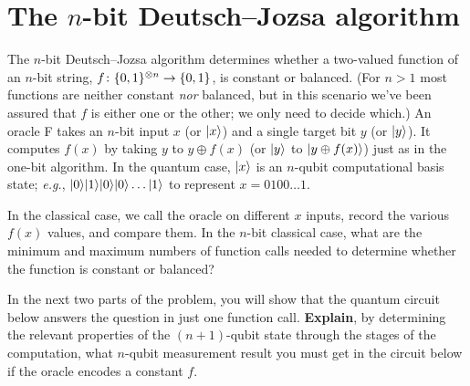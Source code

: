 \documentclass{../phys084}
\author{}
\date{2020 February 12}
\begin{document}
\section{The \(n\)-bit Deutsch--Jozsa algorithm}

\begin{exercise}
  The \(n\)-bit Deutsch--Jozsa algorithm determines whether a
  two-valued function of an \(n\)-bit string,
  \(f \colon \{0, 1\}^{\otimes n} \to \{0, 1\}\), is constant or
  balanced.  (For \(n > 1\) most functions are neither constant
  \textit{nor} balanced, but in this scenario we've been assured that
  \(f\) is either one or the other; we only need to decide which.)  An
  oracle F takes an \(n\)-bit input \(x\) (or \(\lvert x\rangle\)) and a single
  target bit \(y\) (or \(\lvert y\rangle\)).  It computes \(f(x)\) by taking
  \(y\) to \(y \oplus f(x)\) (or \(\lvert y\rangle\) to
  \(\lvert y \oplus f(x)\rangle\)) just as in the one-bit algorithm.  In the
  quantum case, \(\lvert x\rangle\) is an \(n\)-qubit computational basis
  state; \textit{e.g.}, \(\lvert0\rangle \lvert1\rangle \lvert0\rangle \lvert0\rangle \dots \lvert1\rangle\)
  to represent \(x = 0100 \dots 1\).

  \begin{problems}
  \item In the classical case, we call the oracle on different \(x\)
    inputs, record the various \(f(x)\) values, and compare them.  In
    the \(n\)-bit classical case, what are the minimum and maximum
    numbers of function calls needed to determine whether the function
    is constant or balanced?

  \item In the next two parts of the problem, you will show that the
    quantum circuit below answers the question in just one function
    call.  \textbf{Explain}, by determining the relevant properties of
    the \((n+1)\)-qubit state through the stages of the computation,
    what \(n\)-qubit measurement result you must get in the circuit
    below if the oracle encodes a constant \(f\).  \label{itm:circuit}

    \begin{center}
\end{center}
\end{problems}
\end{exercise}
\end{document}
